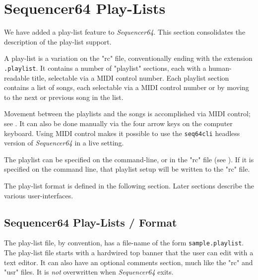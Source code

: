 %
%
%

\section{Sequencer64 Play-Lists}
\label{sec:playlist}

   We have added a play-list feature to \textsl{Sequencer64}.
   This section consolidates the description of the play-list support.

   A play-list is a variation on the "rc" file, conventionally ending with the
   extension \texttt{.playlist}.  It contains a number of "playlist" sections,
   each with a human-readable title, selectable via a MIDI control number.
   Each playlist section contains a list of songs, each selectable via a MIDI
   control number or by moving to the next or previous song in the list.

   Movement between the playlists and the songs is accomplished via 
   MIDI control; see
   .
   It can also be done manually via the four arrow keys on the computer
   keyboard.
   Using MIDI control makes it possible to use the \texttt{seq64cli}
   headless version of \textsl{Sequencer64} in a live setting.

   The playlist can be specified on the command-line, or in
   the "rc" file (see ).
   If it is specified on the command line, that playlist setup will
   be written to the "rc" file.

   The play-list format is defined in the following section.
   Later sections describe the various user-interfaces.

\subsection{Sequencer64 Play-Lists / Format}
\label{subsec:playlist_setup}

   The play-list file, by convention, has a file-name of the form
   \texttt{sample.playlist}.
   The play-list file starts with a hardwired top banner that the user can edit
   with a text editor.  It can also have an optional comments section, much
   like the "rc" and "usr" files.  It is \textsl{not} overwritten
   when \textsl{Sequencer64} exits.


